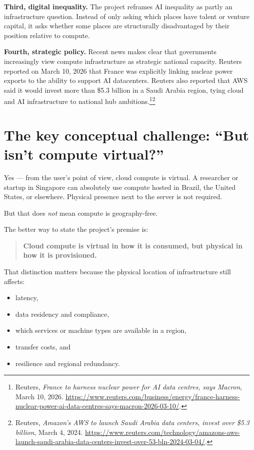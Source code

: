 \documentclass[11pt]{article}
\begin{document}
\textbf{Third, digital inequality.} The project reframes AI inequality as partly an infrastructure question. Instead of only asking which places have talent or venture capital, it asks whether some places are structurally disadvantaged by their position relative to compute.

\textbf{Fourth, strategic policy.} Recent news makes clear that governments increasingly view compute infrastructure as strategic national capacity. Reuters reported on March 10, 2026 that France was explicitly linking nuclear power exports to the ability to support AI datacenters. Reuters also reported that AWS said it would invest more than \$5.3 billion in a Saudi Arabia region, tying cloud and AI infrastructure to national hub ambitions.\footnote{Reuters, \emph{France to harness nuclear power for AI data centres, says Macron}, March 10, 2026. \url{https://www.reuters.com/business/energy/france-harness-nuclear-power-ai-data-centres-says-macron-2026-03-10/}.}\footnote{Reuters, \emph{Amazon's AWS to launch Saudi Arabia data centers, invest over \$5.3 billion}, March 4, 2024. \url{https://www.reuters.com/technology/amazons-aws-launch-saudi-arabia-data-centers-invest-over-53-bln-2024-03-04/}.}

\section{The key conceptual challenge: ``But isn't compute virtual?''}

Yes --- from the user's point of view, cloud compute is virtual. A researcher or startup in Singapore can absolutely use compute hosted in Brazil, the United States, or elsewhere. Physical presence next to the server is not required.

But that does \emph{not} mean compute is geography-free.

The better way to state the project's premise is:

\begin{quote}
\textbf{Cloud compute is virtual in how it is consumed, but physical in how it is provisioned.}
\end{quote}

That distinction matters because the physical location of infrastructure still affects:

\begin{itemize}[leftmargin=*]
  \item latency,
  \item data residency and compliance,
  \item which services or machine types are available in a region,
  \item transfer costs, and
  \item resilience and regional redundancy.
\end{itemize}
\end{document}
